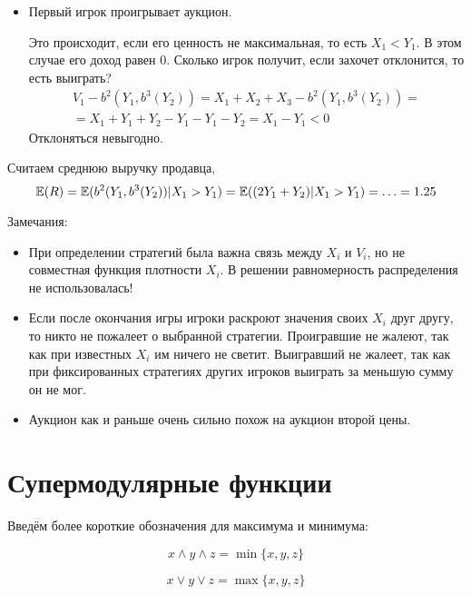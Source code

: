 \begin{myex}
\begin{itemize}
\item Первый игрок проигрывает аукцион.

Это происходит, если его ценность не максимальная, то есть $ X_{1}<Y_{1} $. В этом случае его доход равен 0. Сколько игрок получит, если захочет отклонится, то есть выиграть?
\begin{multline}
 V_{1}-b^{2}(Y_{1},b^{3}(Y_{2}))=X_{1}+X_{2}+X_{3}-b^{2}(Y_{1},b^{3}(Y_{2}))=\\
 =X_{1}+Y_{1}+Y_{2}-Y_{1}-Y_{1}-Y_{2}=X_{1}-Y_{1}<0
\end{multline}
Отклоняться невыгодно.
\end{itemize}


Считаем среднюю выручку продавца,
\begin{equation}
\operatorname{\mathbb{E}}(R)=\operatorname{\mathbb{E}}(b^{2}(Y_{1},b^{3}(Y_{2}))|X_{1}>Y_{1})=\operatorname{\mathbb{E}}((2Y_{1}+Y_{2})|X_{1}>Y_{1})=\ldots=1.25
\end{equation}

Замечания:
\begin{itemize}
\item При определении стратегий была важна связь между $ X_{i} $ и $ V_{i} $, но не совместная функция плотности $ X_{i} $. В решении равномерность распределения не использовалась!
\item Если после окончания игры игроки раскроют значения своих $ X_{i} $ друг другу, то никто не пожалеет о выбранной стратегии. Проигравшие не жалеют, так как при известных $ X_{i} $ им ничего не светит. Выигравший не жалеет, так как при фиксированных стратегиях других игроков выиграть за меньшую сумму он не мог.
\item Аукцион как и раньше очень сильно похож на аукцион второй цены.
\end{itemize}




\end{myex}



\section{Супермодулярные функции}

Введём более короткие обозначения для максимума и минимума:

\begin{equation}
x\wedge y\wedge z =\min\{x,y,z\}
\end{equation}

\begin{equation}
x\vee y\vee z =\max\{x,y,z\}
\end{equation}

